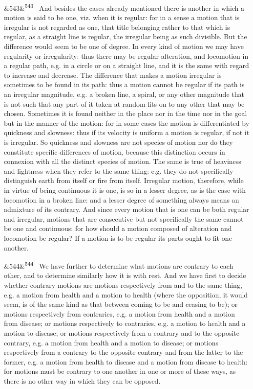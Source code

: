 \documentclass[12pt]{article}
\newcommand{\para}[1][]{\par\noindent\ifx&#1&\else\textsuperscript{\footnotesize #1}~\fi}
\begin{document}
\para[543] And besides the cases already mentioned there is another in which a motion is said to be one, viz. when it is regular: for in a sense a motion that is irregular is not regarded as one, that title belonging rather to that which is regular, as a straight line is regular, the irregular being as such divisible. But the difference would seem to be one of degree. In every kind of motion we may have regularity or irregularity: thus there may be regular alteration, and locomotion in a regular path, e.g. in a circle or on a straight line, and it is the same with regard to increase and decrease. The difference that makes a motion irregular is sometimes to be found in its path: thus a motion cannot be regular if its path is an irregular magnitude, e.g. a broken line, a spiral, or any other magnitude that is not such that any part of it taken at random fits on to any other that may be chosen. Sometimes it is found neither in the place nor in the time nor in the goal but in the manner of the motion: for in some cases the motion is differentiated by quickness and slowness: thus if its velocity is uniform a motion is regular, if not it is irregular. So quickness and slowness are not species of motion nor do they constitute specific differences of motion, because this distinction occurs in connexion with all the distinct species of motion. The same is true of heaviness and lightness when they refer to the same thing: e.g. they do not specifically distinguish earth from itself or fire from itself. Irregular motion, therefore, while in virtue of being continuous it is one, is so in a lesser degree, as is the case with locomotion in a broken line: and a lesser degree of something always means an admixture of its contrary. And since every motion that is one can be both regular and irregular, motions that are consecutive but not specifically the same cannot be one and continuous: for how should a motion composed of alteration and locomotion be regular? If a motion is to be regular its parts ought to fit one another.

\para[544] We have further to determine what motions are contrary to each other, and to determine similarly how it is with rest. And we have first to decide whether contrary motions are motions respectively from and to the same thing, e.g. a motion from health and a motion to health (where the opposition, it would seem, is of the same kind as that between coming to be and ceasing to be); or motions respectively from contraries, e.g. a motion from health and a motion from disease; or motions respectively to contraries, e.g. a motion to health and a motion to disease; or motions respectively from a contrary and to the opposite contrary, e.g. a motion from health and a motion to disease; or motions respectively from a contrary to the opposite contrary and from the latter to the former, e.g. a motion from health to disease and a motion from disease to health: for motions must be contrary to one another in one or more of these ways, as there is no other way in which they can be opposed.
\end{document}
